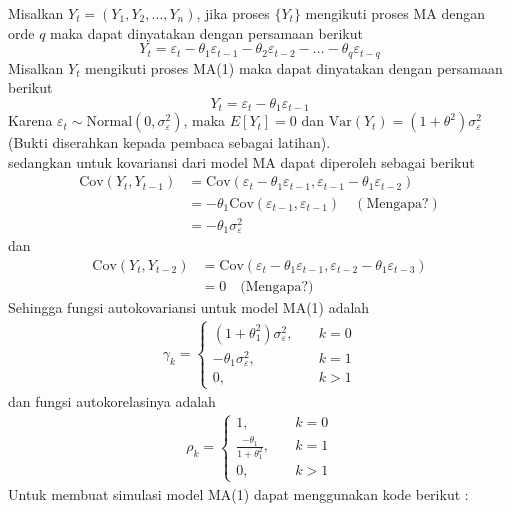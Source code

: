 \documentclass[
]{book}
\begin{document}
Misalkan \(Y_t=(Y_1,Y_2,…,Y_n )\), jika proses \(\{Y_t\}\) mengikuti proses MA dengan orde \(q\) maka dapat dinyatakan dengan persamaan berikut
\begin{equation}
Y_t=\varepsilon_t - \theta_1 \varepsilon_{t-1}-\theta_2 \varepsilon_{t-2}-\dots-\theta_q \varepsilon_{t-q}
\end{equation}
Misalkan \(Y_t\) mengikuti proses MA(1) maka dapat dinyatakan dengan persamaan berikut
\begin{equation}
Y_t=\varepsilon_t - \theta_1 \varepsilon_{t-1}
\end{equation}
Karena \(\varepsilon_t\sim \text{Normal}(0,\sigma^2_\varepsilon)\), maka \(E[Y_t]=0\) dan \(\text{Var}(Y_t)=(1+\theta^2)\sigma_\varepsilon^2\) (Bukti diserahkan kepada pembaca sebagai latihan).\\
sedangkan untuk kovariansi dari model MA dapat diperoleh sebagai berikut\\
\begin{align*}
\text{Cov}(Y_t,Y_{t-1}) &=\text{Cov}(\varepsilon_t-\theta_1 \varepsilon_{t-1}, \varepsilon_{t-1}-\theta_1 \varepsilon_{t-2}) \\
&=-\theta_1 \text{Cov}(\varepsilon_{t-1},\varepsilon_{t-1}) \quad (\text{Mengapa?}) \\
&=-\theta_1 \sigma_\varepsilon^2
\end{align*}
dan
\begin{align*}
\text{Cov}(Y_t,Y_{t-2})&=\text{Cov}(\varepsilon_t - \theta_1 \varepsilon_{t-1},\varepsilon_{t-2}-\theta_1\varepsilon_{t-3}) \\ 
&= 0 \quad \text{(Mengapa?)}
\end{align*}
Sehingga fungsi autokovariansi untuk model MA(1) adalah
\begin{align*}
\gamma_k = \begin{cases}
(1+\theta_1^2)\sigma^2_\varepsilon, \quad &k =0 \\
-\theta_1 \sigma^2_\varepsilon, \quad &k = 1 \\ 
0, \quad &k > 1
\end{cases}
\end{align*}
dan fungsi autokorelasinya adalah
\begin{align*}
\rho_k = \begin{cases}
1, \quad &k =0 \\
\frac{-\theta_1}{1+\theta^2_1}, \quad &k = 1 \\ 
0, \quad &k >1
\end{cases}
\end{align*}
Untuk membuat simulasi model MA(1) dapat menggunakan kode berikut :
\end{document}
